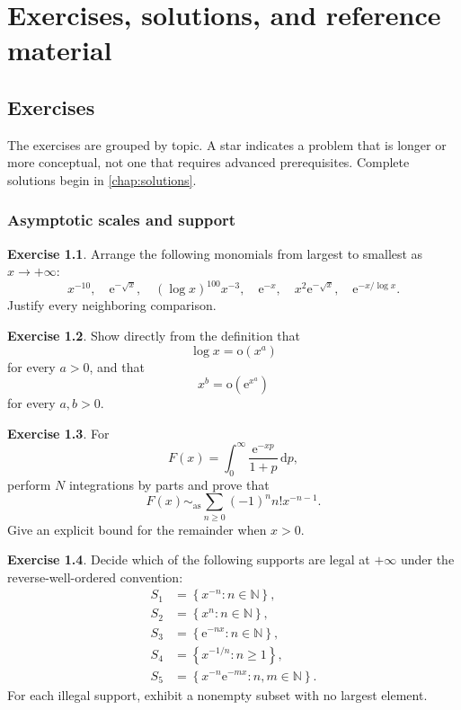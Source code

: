 \documentclass[11pt,openany]{book}
\theoremstyle{plain}
\theoremstyle{definition}
\newtheorem{exercise}{Exercise}[chapter]
\theoremstyle{remark}
\newcommand{\N}{\mathbb{N}}
\newcommand{\smallo}{\mathrm{o}}
\newcommand{\dd}{\,\mathrm{d}}
\newcommand{\e}{\mathrm{e}}
\newcommand{\set}[1]{\left\{#1\right\}}
\newcommand{\asympseries}{\sim_{\mathrm{as}}}
\begin{document}
\part{Exercises, solutions, and reference material}

\chapter{Exercises}
\label{chap:exercises}

The exercises are grouped by topic. A star indicates a problem that is longer or more conceptual, not one that requires advanced prerequisites. Complete solutions begin in \cref{chap:solutions}.

\section{Asymptotic scales and support}

\begin{exercise}
Arrange the following monomials from largest to smallest as $x\to+\infty$:
\[
 x^{-10},\quad \e^{-\sqrt{x}},\quad
 (\log x)^{100}x^{-3},\quad \e^{-x},\quad
 x^2\e^{-\sqrt{x}},\quad \e^{-x/\log x}.
\]
Justify every neighboring comparison.
\end{exercise}

\begin{exercise}
Show directly from the definition that
\[
  \log x=\smallo(x^a)
\]
for every $a>0$, and that
\[
  x^b=\smallo(\e^{x^a})
\]
for every $a,b>0$.
\end{exercise}

\begin{exercise}
For
\[
  F(x)=\int_0^\infty\frac{\e^{-xp}}{1+p}\dd p,
\]
perform $N$ integrations by parts and prove that
\[
  F(x)\asympseries\sum_{n\ge0}(-1)^nn!x^{-n-1}.
\]
Give an explicit bound for the remainder when $x>0$.
\end{exercise}

\begin{exercise}
Decide which of the following supports are legal at $+\infty$ under the reverse-well-ordered convention:
\begin{align*}
 S_1&=\set{x^{-n}:n\in\N},\\
 S_2&=\set{x^n:n\in\N},\\
 S_3&=\set{\e^{-nx}:n\in\N},\\
 S_4&=\set{x^{-1/n}:n\ge1},\\
 S_5&=\set{x^{-n}\e^{-mx}:n,m\in\N}.
\end{align*}
For each illegal support, exhibit a nonempty subset with no largest element.
\end{exercise}
\end{document}
